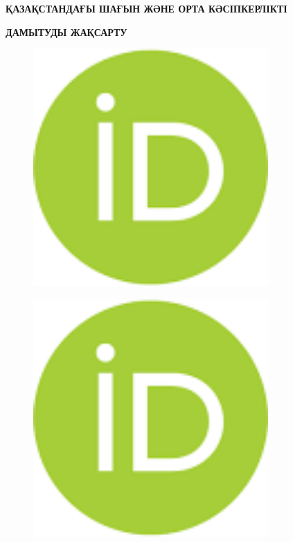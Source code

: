 
{\bfseries ҚАЗАҚСТАНДАҒЫ ШАҒЫН ЖӘНЕ ОРТА КӘСІПКЕРЛІКТІ}

{\bfseries ДАМЫТУДЫ ЖАҚСАРТУ}

\begin{figure}[H]
	\centering
	\includegraphics[width=0.8\textwidth]{media/ekon2/image6}
	\caption*{}
\end{figure}

\begin{figure}[H]
	\centering
	\includegraphics[width=0.8\textwidth]{media/ekon2/image6}
	\caption*{}
\end{figure}

